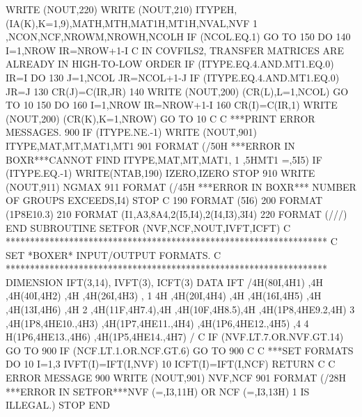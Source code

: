 \begin {ccode}
      WRITE (NOUT,220)
      WRITE (NOUT,210) ITYPEH,(IA(K),K=1,9),MATH,MTH,MAT1H,MT1H,NVAL,NVF
     1 ,NCON,NCF,NROWM,NROWH,NCOLH
      IF (NCOL.EQ.1) GO TO 150
      DO 140 I=1,NROW
      IR=NROW+1-I
C     IN COVFILS2, TRANSFER MATRICES ARE ALREADY IN HIGH-TO-LOW ORDER
      IF (ITYPE.EQ.4.AND.MT1.EQ.0) IR=I
      DO 130 J=1,NCOL
      JR=NCOL+1-J
      IF (ITYPE.EQ.4.AND.MT1.EQ.0) JR=J
  130 CR(J)=C(IR,JR)
  140 WRITE (NOUT,200) (CR(L),L=1,NCOL)
      GO TO 10
  150 DO 160 I=1,NROW
      IR=NROW+1-I
  160 CR(I)=C(IR,1)
      WRITE (NOUT,200) (CR(K),K=1,NROW)
      GO TO 10
C
C     ***PRINT ERROR MESSAGES.
  900 IF (ITYPE.NE.-1) WRITE (NOUT,901) ITYPE,MAT,MT,MAT1,MT1
  901 FORMAT (/50H ***ERROR IN BOXR***CANNOT FIND ITYPE,MAT,MT,MAT1,
     1 ,5HMT1 =,5I5)
      IF (ITYPE.EQ.-1) WRITE(NTAB,190) IZERO,IZERO
      STOP
  910 WRITE (NOUT,911) NGMAX
  911 FORMAT (/45H ***ERROR IN BOXR*** NUMBER OF GROUPS EXCEEDS,I4)
      STOP
C
  190 FORMAT (5I6)
  200 FORMAT (1P8E10.3)
  210 FORMAT (I1,A3,8A4,2(I5,I4),2(I4,I3),3I4)
  220 FORMAT (///)
      END
      SUBROUTINE SETFOR (NVF,NCF,NOUT,IVFT,ICFT)
C     ******************************************************************
C     SET *BOXER* INPUT/OUTPUT FORMATS.
C     ******************************************************************
      DIMENSION IFT(3,14), IVFT(3), ICFT(3)
      DATA IFT /4H(80I,4H1)  ,4H    ,4H(40I,4H2)  ,4H    ,4H(26I,4H3)  ,
     1 4H    ,4H(20I,4H4)  ,4H    ,4H(16I,4H5)  ,4H    ,4H(13I,4H6)  ,4H
     2    ,4H(11F,4H7.4),4H    ,4H(10F,4H8.5),4H    ,4H(1P8,4HE9.2,4H)
     3 ,4H(1P8,4HE10.,4H3)  ,4H(1P7,4HE11.,4H4)  ,4H(1P6,4HE12.,4H5)  ,4
     4 H(1P6,4HE13.,4H6)  ,4H(1P5,4HE14.,4H7)  /
C
      IF (NVF.LT.7.OR.NVF.GT.14) GO TO 900
      IF (NCF.LT.1.OR.NCF.GT.6) GO TO 900
C
C     ***SET FORMATS
      DO 10 I=1,3
      IVFT(I)=IFT(I,NVF)
   10 ICFT(I)=IFT(I,NCF)
      RETURN
C
C     ERROR MESSAGE
  900 WRITE (NOUT,901) NVF,NCF
  901 FORMAT (/28H ***ERROR IN SETFOR***NVF (=,I3,11H) OR NCF (=,I3,13H)
     1 IS ILLEGAL.)
      STOP
      END

\end{ccode}
\normalsize

\cleardoublepage

